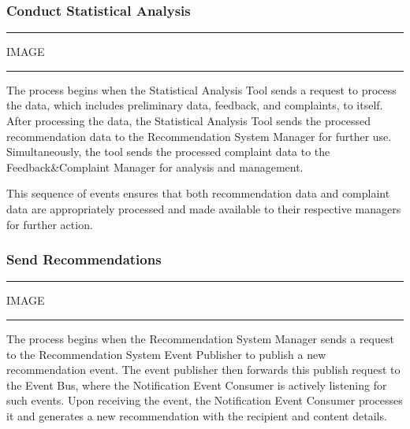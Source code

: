 \subsubsection{Conduct Statistical Analysis}

\vspace{20pt}
\hrule
\vspace{10pt}
IMAGE
\vspace{10pt}
\hrule
\vspace{20pt}

The process begins when the Statistical Analysis Tool sends a request to process the data, which includes preliminary data, feedback, and complaints, to itself. After processing the data, the Statistical Analysis Tool sends the processed recommendation data to the Recommendation System Manager for further use. Simultaneously, the tool sends the processed complaint data to the Feedback\&Complaint Manager for analysis and management.

This sequence of events ensures that both recommendation data and complaint data are appropriately processed and made available to their respective managers for further action.

\subsubsection{Send Recommendations}

\vspace{20pt}
\hrule
\vspace{10pt}
IMAGE
\vspace{10pt}
\hrule
\vspace{20pt}

The process begins when the Recommendation System Manager sends a request to the Recommendation System Event Publisher to publish a new recommendation event. The event publisher then forwards this publish request to the Event Bus, where the Notification Event Consumer is actively listening for such events. Upon receiving the event, the Notification Event Consumer processes it and generates a new recommendation with the recipient and content details. 


